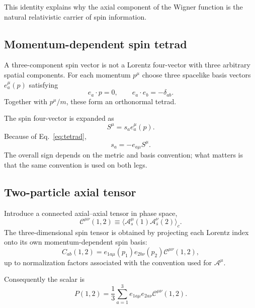 \documentclass[11pt]{article}
\newcommand{\Ccal}{\mathcal C}
\begin{document}
This identity explains why the axial component of the Wigner function is the natural relativistic carrier of spin information.

\subsection{Momentum-dependent spin tetrad}

A three-component spin vector is not a Lorentz four-vector with three arbitrary spatial components. For each momentum $p^\mu$ choose three spacelike basis vectors $e_a^\mu(p)$ satisfying
\begin{equation}
e_a\cdot p=0,
\qquad
e_a\cdot e_b=-\delta_{ab}.
\label{eq:tetrad}
\end{equation}
Together with $p^\mu/m$, these form an orthonormal tetrad.

The spin four-vector is expanded as
\begin{equation}
S^\mu=s_a e_a^\mu(p).
\end{equation}
Because of Eq.~\eqref{eq:tetrad},
\begin{equation}
s_a=-e_{a\mu}S^\mu.
\end{equation}
The overall sign depends on the metric and basis convention; what matters is that the same convention is used on both legs.

\subsection{Two-particle axial tensor}

Introduce a connected axial--axial tensor in phase space,
\begin{equation}
\Ccal^{\mu\nu}(1,2)
\equiv
\langle\mathcal A_s^\mu(1)\mathcal A_{\bar s}^\nu(2)\rangle_c.
\end{equation}
The three-dimensional spin tensor is obtained by projecting each Lorentz index onto its own momentum-dependent spin basis:
\begin{equation}
\boxed{
C_{ab}(1,2)
=e_{1a\mu}(p_1)e_{2b\nu}(p_2)\Ccal^{\mu\nu}(1,2),
}
\label{eq:tetradprojection}
\end{equation}
up to normalization factors associated with the convention used for $\mathcal A^\mu$.

Consequently the scalar is
\begin{equation}
\boxed{
P(1,2)=\frac13\sum_{a=1}^{3}e_{1a\mu}e_{2a\nu}\Ccal^{\mu\nu}(1,2).
}
\label{eq:relP}
\end{equation}
\end{document}
